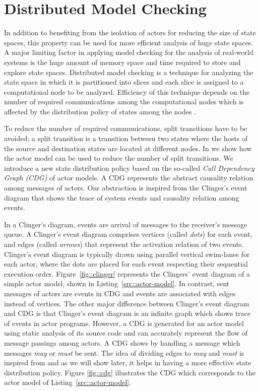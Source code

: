 \section{Distributed Model Checking} \label{sec::DMC}
In addition to benefiting from the isolation of actors for reducing the size of state spaces, this property can be used for more efficient analysis of huge state spaces. A major limiting factor in applying model checking for the analysis of real-world systems is the huge amount of memory space and time required to store and explore state spaces. Distributed model checking is a technique for analyzing the state space in which it is partitioned into slices and each slice is assigned to a computational node to be analyzed. Efficiency of this technique depends on the number of required communications among the computational nodes which is affected by the distribution policy of states among the nodes \cite{DBLP:journals/entcs/OrzanPE05}. 

To reduce the number of required communications, split transitions have to be avoided; a split transition is a transition between two states where the hosts of the source and destination states are located at different nodes. In \cite{DBLP:journals/eceasst/KhamespanahSMSR15} we show how the actor model can be used to reduce the number of split transitions. We introduce a new state distribution policy based on the so-called \textit{Call Dependency Graph (CDG)} of actor models. A CDG represents the abstract causality relation among messages of actors. Our abstraction is inspired from the Clinger's event diagram \cite{clinger} that shows the trace of system events and causality relation among events. 

In a Clinger's diagram, events are arrival of messages to the receiver's message queue. A Clinger's event diagram comprises vertices (called \emph{dots}) for each event, and edges (called \emph{arrows}) that represent the activation relation of two events. Clinger's event diagram is typically drawn using parallel vertical swim-lanes for each actor, where the dots are placed for each event respecting their sequential execution order. Figure~\ref{fig::clinger} represents the Clingers' event diagram of a simple actor model, shown in Listing~\ref{src::actor-model}. In contrast, sent messages of actors are events in CDG and events are associated with edges instead of vertices. The other major difference between Clinger's event diagram and CDG is that Clinger's event diagram is an infinite graph which shows trace of events in actor programs. However, a CDG is generated for an actor model using static analysis of its source code and can accurately represent the flow of message passings among actors. A CDG shows by handling a message which messages \emph{may} or \emph{must} be sent. The idea of dividing edges to \emph{may} and \emph{must} is inspired from \cite{DBLP:conf/lics/LarsenT88} and as we will show later, it helps in having a more effective state distribution policy. Figure \ref{fig::cdg} illustrates the CDG which corresponds to the actor model of Listing~\ref{src::actor-model}.

